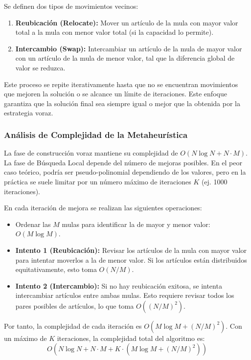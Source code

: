 \documentclass[12pt, a4paper]{article}
\begin{document}
    Se definen dos tipos de movimientos vecinos:
    \begin{enumerate}
        \item \textbf{Reubicación (Relocate):} Mover un artículo de la mula con mayor valor total a la mula con menor valor total (si la capacidad lo permite).
        \item \textbf{Intercambio (Swap):} Intercambiar un artículo de la mula de mayor valor con un artículo de la mula de menor valor, tal que la diferencia global de valor se reduzca.
    \end{enumerate}

    Este proceso se repite iterativamente hasta que no se encuentran movimientos que mejoren la solución o se alcance un límite de iteraciones. Este enfoque garantiza que la solución final sea siempre igual o mejor que la obtenida por la estrategia voraz.

    \subsubsection{Análisis de Complejidad de la Metaheurística}
    La fase de construcción voraz mantiene su complejidad de $O(N \log N + N \cdot M)$. La fase de Búsqueda Local depende del número de mejoras posibles. En el peor caso teórico, podría ser pseudo-polinomial dependiendo de los valores, pero en la práctica se suele limitar por un número máximo de iteraciones $K$ (ej. 1000 iteraciones).

    En cada iteración de mejora se realizan las siguientes operaciones:
    \begin{itemize}
        \item Ordenar las $M$ mulas para identificar la de mayor y menor valor: $O(M \log M)$.
        \item \textbf{Intento 1 (Reubicación):} Revisar los artículos de la mula con mayor valor para intentar moverlos a la de menor valor. Si los artículos están distribuidos equitativamente, esto toma $O(N/M)$.
        \item \textbf{Intento 2 (Intercambio):} Si no hay reubicación exitosa, se intenta intercambiar artículos entre ambas mulas. Esto requiere revisar todos los pares posibles de artículos, lo que toma $O((N/M)^2)$.
    \end{itemize}

    Por tanto, la complejidad de cada iteración es $O(M \log M + (N/M)^2)$. Con un máximo de $K$ iteraciones, la complejidad total del algoritmo es:
    \[
    O(N \log N + N \cdot M + K \cdot (M \log M + (N/M)^2))
    \]
\end{document}
